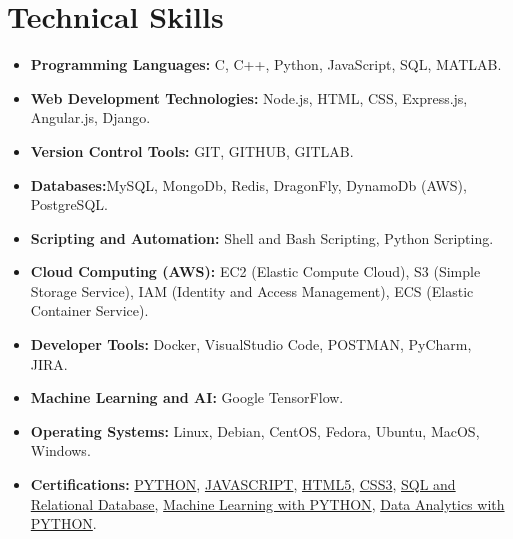 \documentclass[a4paper,11pt]{article}
\newcommand{\resumeItem}[2]{
  \item{
    \textbf{#1}{\textbf{:}\hspace{0.5mm}#2 \vspace{-0.5mm}}
  }
}
\newcommand{\resumeSubItem}[2]{\resumeItem{#1}{#2}\vspace{-4pt}}
\newcommand{\resumeHeadingSkillStart}{\begin{itemize}[leftmargin=*,itemsep=1.7mm, rightmargin=2ex]}
\newcommand{\resumeHeadingSkillEnd}{\end{itemize}\vspace{-2mm}}
\begin{document}
\section{\textbf{Technical Skills}}
 \resumeHeadingSkillStart
   \resumeSubItem{Programming Languages} %
    { C, C++, Python, JavaScript, SQL, MATLAB.} %
   \resumeSubItem{Web Development Technologies} %
    { Node.js, HTML, CSS, Express.js, Angular.js, Django.} %
   \resumeSubItem{Version Control Tools} %
    { GIT, GITHUB, GITLAB.} %
   \resumeSubItem{Databases} %
    {MySQL, MongoDb, Redis, DragonFly, DynamoDb (AWS), PostgreSQL.} %
   \resumeSubItem{Scripting and Automation} %
    { Shell and Bash Scripting, Python Scripting.} %
   \resumeSubItem{Cloud Computing (AWS)} %
    { EC2 (Elastic Compute Cloud), S3 (Simple Storage Service),  IAM (Identity and Access Management), ECS (Elastic Container Service).} %
   \resumeSubItem{Developer Tools} %
    { Docker, VisualStudio Code, POSTMAN, PyCharm, JIRA.} %
   \resumeSubItem{Machine Learning and AI} %
    { Google TensorFlow.} %
   \resumeSubItem{Operating Systems} %
    { Linux, Debian, CentOS, Fedora, Ubuntu, MacOS, Windows.} %
   \resumeSubItem{Certifications} %
    { 
    \href{https://drive.google.com/file/d/1CCLdKiJOFdasjyimUzfc1KVBFrdfcCPQ/view?usp=sharing}{PYTHON}, 
    \href{https://drive.google.com/drive/folders/1H-e4eIoCl9opliXZX4RbJL9vsg2VfFj9}{JAVASCRIPT}, 
    \href{https://drive.google.com/drive/folders/1H-e4eIoCl9opliXZX4RbJL9vsg2VfFj9}{HTML5},
    \href{https://drive.google.com/drive/folders/1H-e4eIoCl9opliXZX4RbJL9vsg2VfFj9}{CSS3}, 
    \href{https://courses.cognitiveclass.ai/certificates/2a41ba476b6d440e9a28f0993bee4fef}{SQL and Relational Database},
    \href{https://courses.cognitiveclass.ai/certificates/98f9b3e2fe054f0b9595f11d67aebba4}{Machine Learning with PYTHON}, 
    \href{https://courses.cognitiveclass.ai/certificates/c130414bfd58452687f6f5f27f23fd25}{Data Analytics with PYTHON}.
    }%
 \resumeHeadingSkillEnd
\vspace{-3mm}

\end{document}
